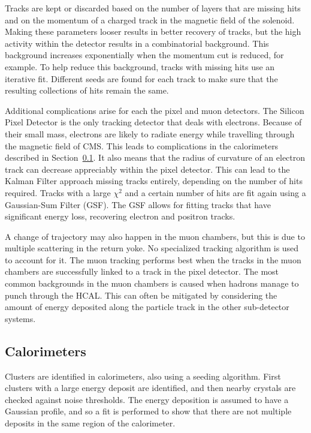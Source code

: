 Tracks are kept or discarded based on the number of layers that are missing hits
and on the momentum of a charged track in the magnetic field of the solenoid.
Making these parameters looser results in better recovery of tracks,
but the high activity within the detector results in a combinatorial background.
This background increases exponentially when the momentum cut is reduced, for example.
To help reduce this background, tracks with missing hits use an iterative fit.
Different seeds are found for each track to make sure that the resulting collections
of hits remain the same.

Additional complications arise for each the pixel and muon detectors.
The Silicon Pixel Detector is the only tracking detector that deals with electrons.
Because of their small mass, electrons are likely to radiate energy
while travelling through the magnetic field of CMS.
This leads to complications in the calorimeters described in Section~\ref{sec:calorimeters}.
It also means that the radius of curvature of an electron track can decrease appreciably
within the pixel detector.
This can lead to the Kalman Filter approach missing tracks entirely,
depending on the number of hits required.
Tracks with a large $\chi^2$ and a certain number of hits are fit again
using a Gaussian-Sum Filter (GSF).
The GSF allows for fitting tracks that have significant energy loss,
recovering electron and positron tracks.

A change of trajectory may also happen in the muon chambers,
but this is due to multiple scattering in the return yoke.
No specialized tracking algorithm is used to account for it.
The muon tracking performs best when the tracks in the muon chambers are successfully
linked to a track in the pixel detector.
The most common backgrounds in the muon chambers
is caused when hadrons manage to punch through the HCAL.
This can often be mitigated by considering the amount of energy deposited along the particle
track in the other sub-detector systems.

\subsection{Calorimeters} \label{sec:calorimeters}

Clusters are identified in calorimeters, also using a seeding algorithm.
First clusters with a large energy deposit are identified,
and then nearby crystals are checked against noise thresholds.
The energy deposition is assumed to have a Gaussian profile,
and so a fit is performed to show that there are not multiple deposits in the same
region of the calorimeter.

